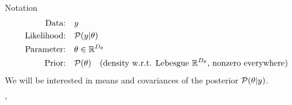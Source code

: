 \documentclass[8pt]{beamer}\usepackage[]{graphicx}\usepackage[]{color}
\begin{document}

\begin{frame}[t]{Notation}
%
\vspace{-2em}
%
\begin{align*}
    \text{Data:}&\quad y \\
    \text{Likelihood:}&\quad\mathcal{P}(y \vert \theta)\\
    \text{Parameter:}& \quad \theta \in \mathbb{R}^{{D_{\theta}}}\\
    \text{Prior:}&\quad \mathcal{P}(\theta) 
        \quad \text{(density w.r.t. Lebesgue $\mathbb{R}^{D_{\theta}}$, 
            nonzero everywhere)}\\
\end{align*}
%
We will be interested in means and covariances of the posterior $\mathcal{P}(\theta \vert y)$.

\pause
%

'%


\end{frame}
\end{document}
